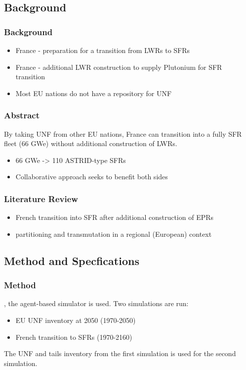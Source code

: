 \subsection{Background}
\begin{frame}
	\frametitle{Background}
	\begin{itemize}
		\item France - preparation for a transition from LWRs to SFRs \cite{noauthor_cne2_nodate}
		\item France - additional LWR construction to supply Plutonium for SFR transition
		\item Most EU nations do not have a repository for UNF
	\end{itemize}
\end{frame}

\begin{frame}
	\frametitle{Abstract}
	By taking UNF from other EU nations, France can transition into a fully SFR fleet (66 GWe)
	without additional construction of LWRs.
	\begin{itemize}
		\item 66 GWe -> 110 ASTRID-type SFRs
		\item Collaborative approach seeks to benefit both sides
	\end{itemize}
\end{frame}

\begin{frame}
	\frametitle{Literature Review}
	\begin{itemize}
		\item French transition into SFR after additional construction of EPRs 	
		\cite{carre_overview_2009, martin_symbiotic_2017, freynet_multiobjective_2016}
		\item partitioning and transmutation in a regional (European) context \cite{fazio_study_2013}
	\end{itemize}
\end{frame}

\subsection{Method and Specfications}

\begin{frame}
	\frametitle{Method}
	\Cyclus, the agent-based simulator \cite{huff_fundamental_2016} is used.
	Two simulations are run:
	\begin{itemize}
		\item EU UNF inventory at 2050 (1970-2050)
		\item French transition to SFRs (1970-2160)
	\end{itemize}
	The UNF and tails inventory from the first simulation is used for the second simulation.
\end{frame}

